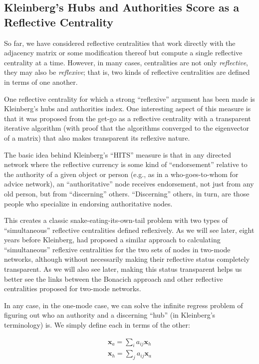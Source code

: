 \documentclass[a4paper,fleqn]{cas-sc}
\begin{document}
\subsection{Kleinberg's Hubs and Authorities Score as a Reflective Centrality}
So far, we have considered reflective centralities that work directly with the adjacency matrix or some modification thereof but compute a single reflective centrality at a time. However, in many cases, centralities are not only \textit{reflective}, they may also be \textit{reflexive}; that is, two kinds of reflective centralities are defined in terms of one another. 

One reflective centrality for which a strong ``reflexive'' argument has been made is Kleinberg's \citeyearpar{kleinberg99} hubs and authorities index. One interesting aspect of this measure is that it was proposed from the get-go as a reflective centrality with a transparent iterative algorithm (with proof that the algorithms converged to the eigenvector of a matrix) that also makes transparent its reflexive nature. 

The basic idea behind Kleinberg's ``HITS'' measure is that in any directed network where the reflective currency is some kind of ``endorsement'' relative to the authority of a given object or person (e.g., as in a who-goes-to-whom for advice network), an ``authoritative'' node receives endorsement, not just from any old person, but from ``discerning'' others.  ``Discerning'' others, in turn, are those people who specialize in endorsing authoritative nodes. 

This creates a classic snake-eating-its-own-tail problem with two types of ``simultaneous'' reflective centralities defined reflexively. As we will see later, eight years before Kleinberg, \citet{bonacich91} had proposed a similar approach to calculating ``simultaneous'' reflexive centralities for the two sets of nodes in two-mode networks, although without necessarily making their reflective status completely transparent. As we will also see later, making this status transparent helps us better see the links between the Bonacich approach and other reflective centralities proposed for two-mode networks. 

In any case, in the one-mode case, we can solve the infinite regress problem of figuring out who an authority and a discerning ``hub'' (in Kleinberg's terminology) is. We simply define each in terms of the other:

\begin{equation}
    \begin{split}
    \mathbf{x}_a = \sum_i  a_{ij} \mathbf{x}_h \\
    \mathbf{x}_h = \sum_j a_{ij} \mathbf{x}_a 
    \end{split}
    \label{eq:klein1}
\end{equation}
\end{document}

